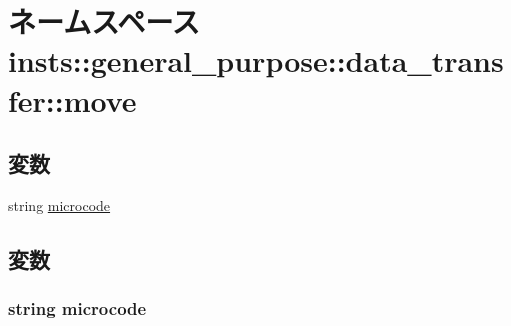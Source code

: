 \hypertarget{namespaceinsts_1_1general__purpose_1_1data__transfer_1_1move}{
\section{ネームスペース insts::general\_\-purpose::data\_\-transfer::move}
\label{namespaceinsts_1_1general__purpose_1_1data__transfer_1_1move}
}
\subsection*{変数}
\begin{DoxyCompactItemize}
\item 
string \hyperlink{namespaceinsts_1_1general__purpose_1_1data__transfer_1_1move_a770f11a173e99389a8802f0107ed8f52}{microcode}
\end{DoxyCompactItemize}


\subsection{変数}
\hypertarget{namespaceinsts_1_1general__purpose_1_1data__transfer_1_1move_a770f11a173e99389a8802f0107ed8f52}{
\subsubsection[{microcode}]{\setlength{\rightskip}{0pt plus 5cm}string {\bf microcode}}}
\label{namespaceinsts_1_1general__purpose_1_1data__transfer_1_1move_a770f11a173e99389a8802f0107ed8f52}
